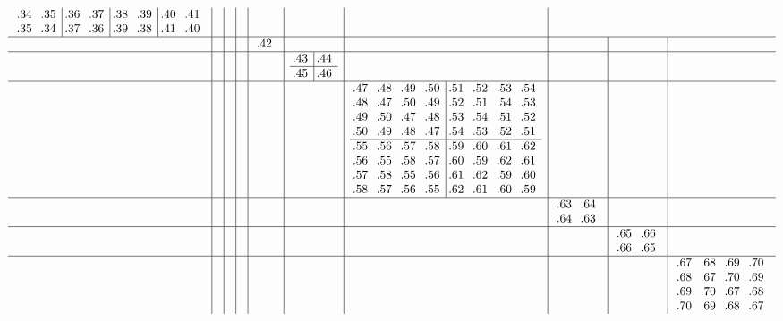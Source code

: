 \documentclass[12pt,a4paper,landscape]{amsart}
\begin{document}
\begin{align*}
\begin{array}{c|c|c|c|c|c|c|c|c|c}
\begin{array}{rr|rr|rr|rr}
\llap.34&\llap.35&\llap.36&\llap.37&\llap.38&\llap.39&\llap.40&\llap.41\\%
\llap.35&\llap.34&\llap.37&\llap.36&\llap.39&\llap.38&\llap.41&\llap.40\\%
\end{array}%
&&&&&&\\\hline
&&&&
\begin{array}{r}%
\llap.42\\%
\end{array}%
&&&&&\\\hline
&&&&&
\begin{array}{r|r}%
\llap.43&\llap.44\\\hline%
\llap.45&\llap.46\\%
\end{array}%
&&&&\\\hline
&&&&&&
\begin{array}{rrrr|rrrr}%
\llap.47&\llap.48&\llap.49&\llap.50&\llap.51&\llap.52&\llap.53&\llap.54\\%
\llap.48&\llap.47&\llap.50&\llap.49&\llap.52&\llap.51&\llap.54&\llap.53\\%
\llap.49&\llap.50&\llap.47&\llap.48&\llap.53&\llap.54&\llap.51&\llap.52\\%
\llap.50&\llap.49&\llap.48&\llap.47&\llap.54&\llap.53&\llap.52&\llap.51\\\hline%
\llap.55&\llap.56&\llap.57&\llap.58&\llap.59&\llap.60&\llap.61&\llap.62\\%
\llap.56&\llap.55&\llap.58&\llap.57&\llap.60&\llap.59&\llap.62&\llap.61\\%
\llap.57&\llap.58&\llap.55&\llap.56&\llap.61&\llap.62&\llap.59&\llap.60\\%
\llap.58&\llap.57&\llap.56&\llap.55&\llap.62&\llap.61&\llap.60&\llap.59\\%
\end{array}%
&&&\\\hline
&&&&&&&
\begin{array}{rr}%
\llap.63&\llap.64\\%
\llap.64&\llap.63\\%
\end{array}%
&&\\\hline
&&&&&&&&
\begin{array}{rr}%
\llap.65&\llap.66\\%
\llap.66&\llap.65\\%
\end{array}%
&\\\hline
&&&&&&&&&
\begin{array}{rrrr}%
\llap.67&\llap.68&\llap.69&\llap.70\\%
\llap.68&\llap.67&\llap.70&\llap.69\\%
\llap.69&\llap.70&\llap.67&\llap.68\\%
\llap.70&\llap.69&\llap.68&\llap.67\\%
\end{array}%
  \end{array}
\end{align*}
\end{document}
